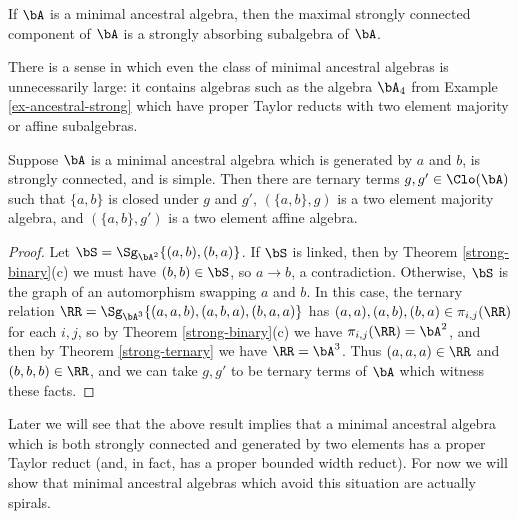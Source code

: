 \begin{cor}\label{minimal-ancestral-maximal} If $\bA$ is a minimal ancestral algebra, then the maximal strongly connected component of $\bA$ is a strongly absorbing subalgebra of $\bA$.
\end{cor}

There is a sense in which even the class of minimal ancestral algebras is unnecessarily large: it contains algebras such as the algebra $\bA_4$ from Example \ref{ex-ancestral-strong} which have proper Taylor reducts with two element majority or affine subalgebras.

\begin{thm} Suppose $\bA$ is a minimal ancestral algebra which is generated by $a$ and $b$, is strongly connected, and is simple. Then there are ternary terms $g,g' \in \Clo(\bA)$ such that $\{a,b\}$ is closed under $g$ and $g'$, $(\{a,b\},g)$ is a two element majority algebra, and $(\{a,b\},g')$ is a two element affine algebra.
\end{thm}
\begin{proof} Let $\bS = \Sg_{\bA^2}\{(a,b),(b,a)\}$. If $\bS$ is linked, then by Theorem \ref{strong-binary}(c) we must have $(b,b) \in \bS$, so $a \rightarrow b$, a contradiction. Otherwise, $\bS$ is the graph of an automorphism swapping $a$ and $b$. In this case, the ternary relation $\RR = \Sg_{\bA^3}\{(a,a,b),(a,b,a),(b,a,a)\}$ has $(a,a),(a,b),(b,a) \in \pi_{i,j}(\RR)$ for each $i,j$, so by Theorem \ref{strong-binary}(c) we have $\pi_{i,j}(\RR) = \bA^2$, and then by Theorem \ref{strong-ternary} we have $\RR = \bA^3$. Thus $(a,a,a) \in \RR$ and $(b,b,b) \in \RR$, and we can take $g,g'$ to be ternary terms of $\bA$ which witness these facts.%
\end{proof}

Later we will see that the above result implies that a minimal ancestral algebra which is both strongly connected and generated by two elements has a proper Taylor reduct (and, in fact, has a proper bounded width reduct). For now we will show that minimal ancestral algebras which avoid this situation are actually spirals.

